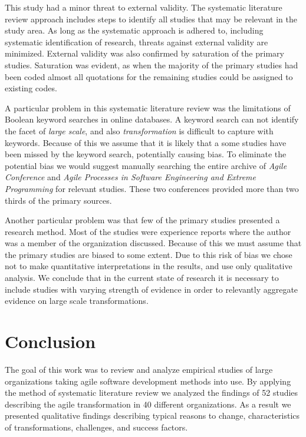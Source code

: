 This study had a minor threat to external validity. The systematic literature
review approach includes steps to identify all studies that may be relevant in
the study area. As long as the systematic approach is adhered to, including
systematic identification of research, threats against external validity are
minimized. External validity was also confirmed by saturation of the primary
studies. Saturation was evident, as when the majority of the primary studies had
been coded almost all quotations for the remaining studies could be assigned to
existing codes.

A particular problem in this systematic literature review was the limitations of
Boolean keyword searches in online databases. A keyword search can not identify
the facet of \emph{large scale}, and also \emph{transformation} is difficult to
capture with keywords. Because of this we assume that it is likely that a some
studies have been missed by the keyword search, potentially causing bias. To
eliminate the potential bias we would suggest manually searching the entire
archive of \emph{Agile Conference} and \emph{Agile Processes in Software
Engineering and Extreme Programming} for relevant studies. These two conferences
provided more than two thirds of the primary sources.

Another particular problem was that few of the primary studies presented a
research method. Most of the studies were experience reports where the author
was a member of the organization discussed. Because of this we must assume that
the primary studies are biased to some extent. Due to this risk of bias we chose
not to make quantitative interpretations in the results, and use only
qualitative analysis. We conclude that in the current state of research it is
necessary to include studies with varying strength of evidence in order to
relevantly aggregate evidence on large scale transformations.


\section{Conclusion}

The goal of this work was to review and analyze empirical studies of large
organizations taking agile software development methods into use. By applying
the method of systematic literature review we analyzed the findings of 52
studies describing the agile transformation in 40 different organizations. As a
result we presented qualitative findings describing typical reasons to change,
characteristics of transformations, challenges, and success factors.

